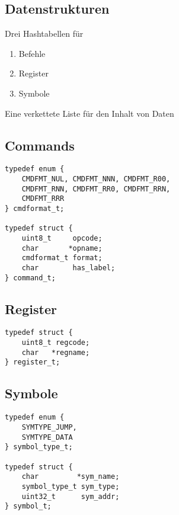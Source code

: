 \subsection{Datenstrukturen}

\begin{frame}{\insertsection}{\insertsubsection}
    Drei Hashtabellen für
    \begin{enumerate}
        \item Befehle
        \item Register
        \item Symbole
    \end{enumerate}
    Eine verkettete Liste für den Inhalt von Daten
\end{frame}

\subsection{Commands}

\begin{frame}[fragile]{\insertsubsection}
\begin{lstlisting}
typedef enum {
    CMDFMT_NUL, CMDFMT_NNN, CMDFMT_R00,
    CMDFMT_RNN, CMDFMT_RR0, CMDFMT_RRN,
    CMDFMT_RRR
} cmdformat_t;

typedef struct {
    uint8_t     opcode;
    char       *opname;
    cmdformat_t format;
    char        has_label;
} command_t;
\end{lstlisting}
\end{frame}

\subsection{Register}

\begin{frame}[fragile]{\insertsubsection}
\begin{lstlisting}
typedef struct {
    uint8_t regcode;
    char   *regname;
} register_t;
\end{lstlisting}
\end{frame}

\subsection{Symbole}

\begin{frame}[fragile]{\insertsubsection}
\begin{lstlisting}
typedef enum {
    SYMTYPE_JUMP,
    SYMTYPE_DATA
} symbol_type_t;

typedef struct {
    char         *sym_name;
    symbol_type_t sym_type;
    uint32_t      sym_addr;
} symbol_t;
\end{lstlisting}
\end{frame}

